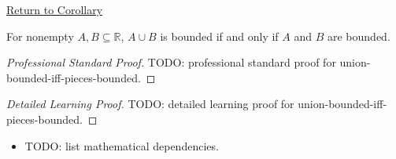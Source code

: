 \newpage
{}
\label{prf:union-bounded-iff-pieces-bounded}

\begin{remark*}[Return]
\hyperref[cor:union-bounded-iff-pieces-bounded]{Return to Corollary}
\end{remark*}

\begin{corollary*}
For nonempty $A,B\subseteq\mathbb{R}$, $A\cup B$ is bounded if and only if
$A$ and $B$ are bounded.
\end{corollary*}

\begin{proof}[Professional Standard Proof]
\LRAProofBodyStart
TODO: professional standard proof for union-bounded-iff-pieces-bounded.
\end{proof}

\begin{proof}[Detailed Learning Proof]
\LRAProofBodyStart
TODO: detailed learning proof for union-bounded-iff-pieces-bounded.
\end{proof}

\begin{remark*}
\end{remark*}

\begin{dependencies}
\begin{itemize}
  \item TODO: list mathematical dependencies.
\end{itemize}
\end{dependencies}

\clearpage
